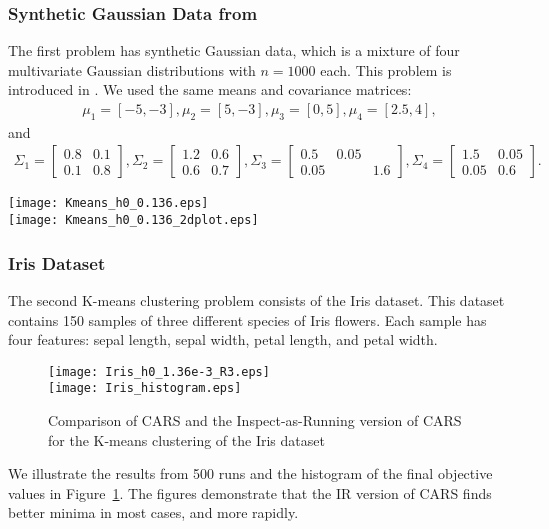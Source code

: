 \subsubsection*{Synthetic Gaussian Data from \cite{yin2018stochastic}}
The first problem has synthetic Gaussian data, which is a mixture of four multivariate Gaussian distributions with $n = 1000$ each. This problem is introduced in \cite{yin2018stochastic}. We used the same means and covariance matrices:
\begin{align*}
    \mu_1 = [-5, -3], \mu_2 = [5, -3], \mu_3 = [0, 5], \mu_4 = [2.5, 4],
\end{align*}
    and 
\begin{align*}
    \Sigma_1 = \begin{bmatrix}
        0.8 & 0.1 \\ 0.1 & 0.8
    \end{bmatrix}, 
    \Sigma_2 = \begin{bmatrix}
        1.2 & 0.6 \\ 0.6 & 0.7
    \end{bmatrix}, 
    \Sigma_3 = \begin{bmatrix}
        0.5 & 0.05 \\ 0.05 && 1.6
    \end{bmatrix},
    \Sigma_4 = \begin{bmatrix}
        1.5 & 0.05 \\ 0.05 & 0.6
    \end{bmatrix}.
\end{align*}
\begin{figure*}
    \centering
    {\texttt{[image: Kmeans\_h0\_0.136.eps]}}\\
    \vspace{3mm}
    {\texttt{[image: Kmeans\_h0\_0.136\_2dplot.eps]}}
    \caption{Comparison of CARS and the Inspect-as-Running version of CARS for the K-means clustering problem of synthetic Gaussian data}
    \label{fig: K-means synthetic}
\end{figure*}

\subsubsection*{Iris Dataset}
The second K-means clustering problem consists of the Iris dataset. This dataset contains 150 samples of three different species of Iris flowers. Each sample has four features: sepal length, sepal width, petal length, and petal width.
\begin{figure}
    \centering
    {\texttt{[image: Iris\_h0\_1.36e-3\_R3.eps]}}\\
    \vspace{3mm}
    {\texttt{[image: Iris\_histogram.eps]}}
    \caption{Comparison of CARS and the Inspect-as-Running version of CARS for the K-means clustering of the Iris dataset}
    \label{fig: K-means Iris}
\end{figure}
We illustrate the results from 500 runs and the histogram of the final objective values in Figure~\ref{fig: K-means Iris}.
The figures demonstrate that the IR version of CARS finds better minima in most cases, and more rapidly.

